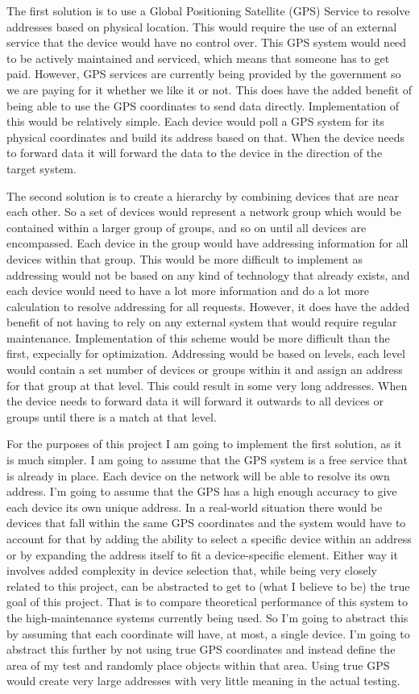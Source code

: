 \documentclass{amsart}
\begin{document}
The first solution is to use a Global Positioning Satellite (GPS) Service to resolve addresses based on physical location. This would require the use of an external service that the device would have no control over. This GPS system would need to be actively maintained and serviced, which means that someone has to get paid. However, GPS services are currently being provided by the government so we are paying for it whether we like it or not. This does have the added benefit of being able to use the GPS coordinates to send data directly. Implementation of this would be relatively simple. Each device would poll a GPS system for its physical coordinates and build its address based on that. When the device needs to forward data it will forward the data to the device in the direction of the target system.

The second solution is to create a hierarchy by combining devices that are near each other. So a set of devices would represent a network group which would be contained within a larger group of groups, and so on until all devices are encompassed. Each device in the group would have addressing information for all devices within that group. This would be more difficult to implement as addressing would not be based on any kind of technology that already exists, and each device would need to have a lot more information and do a lot more calculation to resolve addressing for all requests. However, it does have the added benefit of not having to rely on any external system that would require regular maintenance. Implementation of this scheme would be more difficult than the first, expecially for optimization. Addressing would be based on levels, each level would contain a set number of devices or groups within it and assign an address for that group at that level. This could result in some very long addresses. When the device needs to forward data it will forward it outwards to all devices or groups until there is a match at that level.

For the purposes of this project I am going to implement the first solution, as it is much simpler. I am going to assume that the GPS system is a free service that is already in place. Each device on the network will be able to resolve its own address. I'm going to assume that the GPS has a high enough accuracy to give each device its own unique address. In a real-world situation there would be devices that fall within the same GPS coordinates and the system would have to account for that by adding the ability to select a specific device within an address or by expanding the address itself to fit a device-specific element. Either way it involves added complexity in device selection that, while being very closely related to this project, can be abstracted to get to (what I believe to be) the true goal of this project. That is to compare theoretical performance of this system to the high-maintenance systems currently being used. So I'm going to abstract this by assuming that each coordinate will have, at most, a single device. I'm going to abstract this further by not using true GPS coordinates and instead define the area of my test and randomly place objects within that area. Using true GPS would create very large addresses with very little meaning in the actual testing.
\end{document}

